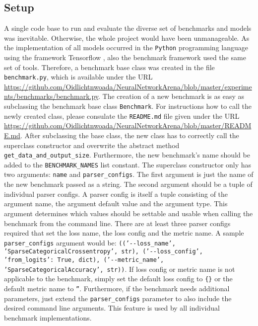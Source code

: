 \documentclass[draft,final]{vutinfth} %
\begin{document}
    \subsection{Setup}
    A single code base to run and evaluate the diverse set of benchmarks and models was inevitable. 
    Otherwise, the whole project would have been unmanageable.
    As the implementation of all models occurred in the \texttt{Python} programming language \cite{Python3} using the framework Tensorflow \cite{Tensorflow}, also the benchmark framework used the same set of tools.  
    Therefore, a benchmark base class was created in the file \texttt{benchmark.py}, which is available under the URL \url{https://github.com/Oidlichtnwoada/NeuralNetworkArena/blob/master/experiments/benchmarks/benchmark.py}.
    The creation of a new benchmark is as easy as subclassing the benchmark base class \texttt{Benchmark}.
    For instructions how to call the newly created class, please consulate the \texttt{README.md} file given under the URL \url{https://github.com/Oidlichtnwoada/NeuralNetworkArena/blob/master/README.md}.
    After subclassing the base class, the new class has to correctly call the superclass constructor and overwrite the abstract method \texttt{get\_data\_and\_output\_size}.
    Furthermore, the new benchmark's name should be added to the \texttt{BENCHMARK\_NAMES} list constant.
    The superclass constructor only has two arguments: \texttt{name} and \texttt{parser\_configs}. 
    The first argument is just the name of the new benchmark passed as a string.
    The second argument should be a tuple of individual parser configs. 
    A parser config is itself a tuple consisting of the argument name, the argument default value and the argument type.
    This argument determines which values should be settable and usable when calling the benchmark from the command line.
    There are at least three parser configs required that set the loss name, the loss config and the metric name.
    A sample \texttt{parser\_configs} argument would be: \texttt{(('-{}-loss\_name', 'SparseCategoricalCrossentropy', str), ('-{}-loss\_config', {'from\_logits': True}, dict), ('-{}-metric\_name', 'SparseCategoricalAccuracy', str))}.
    If loss config or metric name is not applicable to the benchmark, simply set the default loss config to \texttt{\{\}} or the default metric name to \texttt{''}.
    Furthermore, if the benchmark needs additional parameters, just extend the \texttt{parser\_configs} parameter to also include the desired command line arguments.
    This feature is used by all individual benchmark implementations. 
\end{document}
